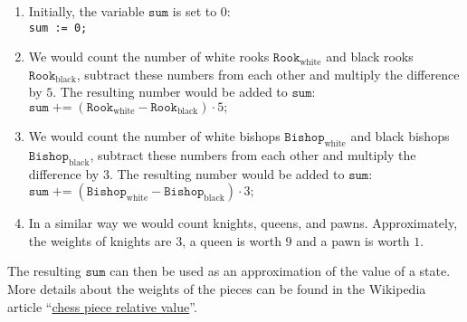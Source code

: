 \begin{enumerate}
\item Initially, the variable $\mathtt{sum}$ is set to $0$:
      \\[0.2cm]
      \hspace*{1.3cm}
      \texttt{sum := 0;}
\item We would count the number of white rooks $\mathtt{Rook}_{\mathrm{white}}$ and black rooks $\mathtt{Rook}_{\mathrm{black}}$,
      subtract these numbers from each other and multiply the difference by $5$.  
      The resulting number would be added to $\mathtt{sum}$:
      \\[0.2cm]
      \hspace*{1.3cm}
      $\mathtt{sum} \;\texttt{+=}\; (\mathtt{Rook}_{\mathrm{white}} - \mathtt{Rook}_{\mathrm{black}}) \cdot 5\mathtt{;}$
\item We would count the number of white bishops $\mathtt{Bishop}_{\mathrm{white}}$ and black bishops
      $\mathtt{Bishop}_{\mathrm{black}}$,
      subtract these numbers from each other and multiply the difference by $3$.  
      The resulting number would be added to $\mathtt{sum}$:
      \\[0.2cm]
      \hspace*{1.3cm}
      $\mathtt{sum} \;\texttt{+=}\; (\mathtt{Bishop}_{\mathrm{white}} - \mathtt{Bishop}_{\mathrm{black}}) \cdot 3\mathtt{;}$
\item In a similar way we would count knights, queens, and pawns.  Approximately, the weights of
      knights are $3$, a queen is worth $9$ and a pawn is worth $1$.
\end{enumerate}
The resulting $\mathtt{sum}$ can then be used as an approximation of the value of a state.
More details about the weights of the pieces can be found in the Wikipedia article 
``\href{https://en.wikipedia.org/wiki/Chess_piece_relative_value}{chess piece relative value}''.



